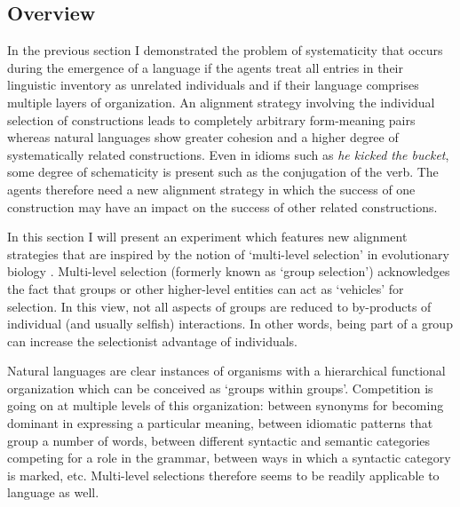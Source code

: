 \subsection{Overview}
In the previous section I demonstrated the problem of systematicity that occurs during the emergence of a language if the agents treat all entries in their linguistic inventory as unrelated individuals and if their language comprises multiple layers of organization. An alignment strategy involving the individual selection of constructions leads to completely arbitrary form-meaning pairs whereas natural languages show greater cohesion and a higher degree of systematically related constructions. Even in idioms such as {\em he kicked the bucket}, some degree of schematicity is present such as the conjugation of the verb. The agents therefore need a new alignment strategy in which the success of one construction may have an impact on the success of other related constructions.

In this section I will present an experiment which features new alignment strategies that are inspired by the notion of `multi-level selection' in evolutionary biology \citep{wilson94group}. Multi-level selection (formerly known as `group selection') acknowledges the fact that groups or other higher-level entities can act as `vehicles' for selection. In this view, not all aspects of groups are reduced to by-products of individual (and usually selfish) interactions. In other words, being part of a group can increase the selectionist advantage of individuals.%

Natural languages are clear instances of organisms with a hierarchical functional organization which can be conceived as `groups within groups'. Competition is going on at multiple levels of this organization: between synonyms for becoming dominant in expressing a particular meaning, between idiomatic patterns that group a number of words, between different syntactic and semantic categories competing for a role in the grammar, between ways in which a syntactic category is marked, etc. Multi-level selections therefore seems to be readily applicable to language as well.

